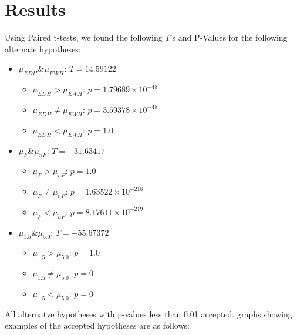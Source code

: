 \documentclass{article}
\begin{document}
\section*{Results}
Using Paired t-tests, we found the following $T$'s and P-Values for the following alternate hypotheses:
\begin{itemize}
  \item $\mu_{EDH}$\&$\mu_{EWH}$: $T=14.59122$
  \begin{itemize}
    \item $\mu_{EDH}>\mu_{EWH}$: $p=1.79689\times10^{-48}$
    \item $\mu_{EDH}\neq\mu_{EWH}$: $p=3.59378\times10^{-48}$
    \item $\mu_{EDH}<\mu_{EWH}$: $p=1.0$
  \end{itemize}  
  \item $\mu_{F}$\&$\mu_{nF}$: $T=-31.63417$
  \begin{itemize}
    \item $\mu_{F}>\mu_{nF}$: $p=1.0$
    \item $\mu_{F}\neq\mu_{nF}$: $p=1.63522\times10^{-218}$
    \item $\mu_{F}<\mu_{nF}$: $p=8.17611\times10^{-219}$
  \end{itemize}
  \item $\mu_{1.5}$\&$\mu_{5.0}$: $T=-55.67372$
  \begin{itemize}
    \item $\mu_{1.5}>\mu_{5.0}$: $p=1.0$
    \item $\mu_{1.5}\neq\mu_{5.0}$: $p=0$
    \item $\mu_{1.5}<\mu_{5.0}$: $p=0$
  \end{itemize}
\end{itemize}

All alternatve hypotheses with p-values less than 0.01 accepted. graphs showing examples of the accepted hypotheses are as follows:
\end{document}
